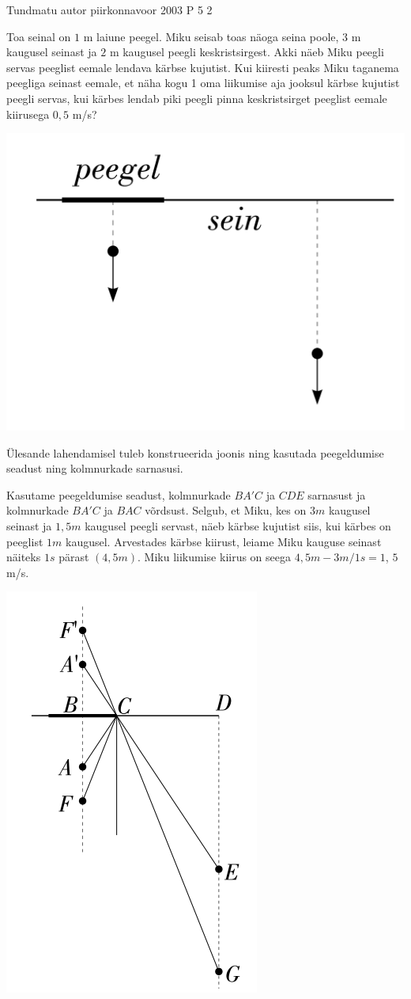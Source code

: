 {Tundmatu autor} %
{piirkonnavoor} %
{2003} %
{P 5} %
{2} %
{
\ifStatement
Toa seinal on $1$ m laiune peegel. Miku seisab toas näoga seina poole, $3$ m kaugusel seinast ja $2$ m kaugusel peegli keskristsirgest. Akki näeb Miku peegli servas peeglist eemale lendava kärbse kujutist. Kui kiiresti peaks Miku taganema peegliga seinast eemale, et näha kogu 1 oma liikumise aja jooksul kärbse kujutist peegli servas, kui kärbes lendab piki peegli pinna keskristsirget peeglist eemale kiirusega $0,5$ m/s?
\begin{center}
	\includegraphics[width=0.5\linewidth]{2003-v2p-05-yl.PNG}
\end{center}
\fi

\ifHint
Ülesande lahendamisel tuleb konstrueerida joonis ning kasutada peegeldumise seadust ning kolmnurkade sarnasusi.
\fi


\ifSolution
Kasutame peegeldumise seadust, kolmnurkade $BA'C$ ja $CDE$ sarnasust ja kolmnurkade $BA'C$ ja $BAC$ võrdsust. Selgub, et Miku, kes on $3 m$ kaugusel seinast ja $1,5 m$ kaugusel peegli servast, näeb kärbse kujutist siis, kui kärbes on peeglist $1 m$ kaugusel. Arvestades kärbse kiirust, leiame Miku kauguse seinast näiteks $1 s$ pärast $(4,5 m)$. Miku liikumise kiirus on seega $4,5 m - 3 m/1 s= 1$, $5$ m/s.
\begin{center}
	\includegraphics[width=0.5\linewidth]{2003-v2p-05-lah.PNG}
\end{center}
\fi
}
 
